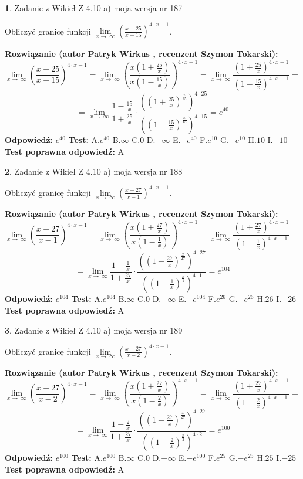 \documentclass[12pt, a4paper]{article}
\theoremstyle{definition} %
\newtheorem{zad}{}
\newcommand{\zadStart}[1]{\begin{zad}#1\newline}
\newcommand{\zadStop}{\end{zad}}
\newcommand{\rozwStart}[2]{\noindent \textbf{Rozwiązanie (autor #1 , recenzent #2): }\newline}
\newcommand{\rozwStop}{\newline}
\newcommand{\odpStart}{\noindent \textbf{Odpowiedź:}\newline}
\newcommand{\odpStop}{\newline}
\newcommand{\testStart}{\noindent \textbf{Test:}\newline}
\newcommand{\testStop}{\newline}
\newcommand{\kluczStart}{\noindent \textbf{Test poprawna odpowiedź:}\newline}
\newcommand{\kluczStop}{\newline}
\begin{document}
\zadStart{Zadanie z Wikieł Z 4.10 a) moja wersja nr 187}

Obliczyć granicę funkcji  $\lim\limits_{x\to\ \infty}(\frac{x+25}{x-15})^{4\cdot x-1}$.
\zadStop
\rozwStart{Patryk Wirkus}{Szymon Tokarski}
$$\lim\limits_{x\to\ \infty}(\frac{x+25}{x-15})^{4\cdot x-1} = \lim\limits_{x\to\ \infty}(\frac{x(1+\frac{25}{x})}{x(1-\frac{15}{x})})^{4\cdot x-1}=\lim\limits_{x\to\ \infty}\frac{(1+\frac{25}{x})^{4\cdot x-1}}{(1-\frac{15}{x})^{4\cdot x-1}}=$$
$$=\lim\limits_{x\to\ \infty}\frac{1-\frac{15}{x}}{1+\frac{25}{x}}\cdot\frac{((1+\frac{25}{x})^{\frac{x}{25}})^{4\cdot25}}{((1-\frac{15}{x})^{\frac{x}{15}})^{4\cdot15}}=e^{40}$$
\rozwStop
\odpStart
$e^{40}$
\odpStop
\testStart
A.$e^{40}$ B.$\infty$ C.$0$ D.$-\infty$ E.$-e^{40}$
F.$e^{10}$ G.$-e^{10}$
H.$10$
I.$-10$
\testStop
\kluczStart
A
\kluczStop



\zadStart{Zadanie z Wikieł Z 4.10 a) moja wersja nr 188}

Obliczyć granicę funkcji  $\lim\limits_{x\to\ \infty}(\frac{x+27}{x-1})^{4\cdot x-1}$.
\zadStop
\rozwStart{Patryk Wirkus}{Szymon Tokarski}
$$\lim\limits_{x\to\ \infty}(\frac{x+27}{x-1})^{4\cdot x-1} = \lim\limits_{x\to\ \infty}(\frac{x(1+\frac{27}{x})}{x(1-\frac{1}{x})})^{4\cdot x-1}=\lim\limits_{x\to\ \infty}\frac{(1+\frac{27}{x})^{4\cdot x-1}}{(1-\frac{1}{x})^{4\cdot x-1}}=$$
$$=\lim\limits_{x\to\ \infty}\frac{1-\frac{1}{x}}{1+\frac{27}{x}}\cdot\frac{((1+\frac{27}{x})^{\frac{x}{27}})^{4\cdot27}}{((1-\frac{1}{x})^{\frac{x}{1}})^{4\cdot1}}=e^{104}$$
\rozwStop
\odpStart
$e^{104}$
\odpStop
\testStart
A.$e^{104}$ B.$\infty$ C.$0$ D.$-\infty$ E.$-e^{104}$
F.$e^{26}$ G.$-e^{26}$
H.$26$
I.$-26$
\testStop
\kluczStart
A
\kluczStop



\zadStart{Zadanie z Wikieł Z 4.10 a) moja wersja nr 189}

Obliczyć granicę funkcji  $\lim\limits_{x\to\ \infty}(\frac{x+27}{x-2})^{4\cdot x-1}$.
\zadStop
\rozwStart{Patryk Wirkus}{Szymon Tokarski}
$$\lim\limits_{x\to\ \infty}(\frac{x+27}{x-2})^{4\cdot x-1} = \lim\limits_{x\to\ \infty}(\frac{x(1+\frac{27}{x})}{x(1-\frac{2}{x})})^{4\cdot x-1}=\lim\limits_{x\to\ \infty}\frac{(1+\frac{27}{x})^{4\cdot x-1}}{(1-\frac{2}{x})^{4\cdot x-1}}=$$
$$=\lim\limits_{x\to\ \infty}\frac{1-\frac{2}{x}}{1+\frac{27}{x}}\cdot\frac{((1+\frac{27}{x})^{\frac{x}{27}})^{4\cdot27}}{((1-\frac{2}{x})^{\frac{x}{2}})^{4\cdot2}}=e^{100}$$
\rozwStop
\odpStart
$e^{100}$
\odpStop
\testStart
A.$e^{100}$ B.$\infty$ C.$0$ D.$-\infty$ E.$-e^{100}$
F.$e^{25}$ G.$-e^{25}$
H.$25$
I.$-25$
\testStop
\kluczStart
A
\kluczStop
\end{document}

